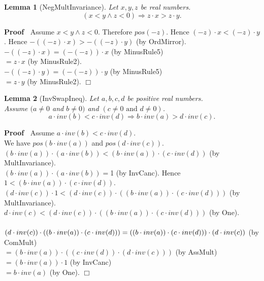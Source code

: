 \documentclass{article}
\newenvironment{forthel}{\begin{leftbar}}{\end{leftbar}}
\newenvironment{proof}{\noindent\textbf{Proof\ }}{\hspace*{\fill}$\Box$\medskip}
\newtheorem{lemma}{Lemma}
\newcommand{\dotequal}{=}
\begin{document}
\begin{forthel}
	
	\begin{lemma}[NegMultInvariance]
	Let $x, y, z$ be real numbers.
	$$(x < y \wedge z < 0) \Rightarrow z \cdot x > z \cdot y.$$
	\end{lemma}
	\begin{proof}
	Assume $x < y \wedge z < 0$.
	Therefore $pos(-z)$.    
	Hence $(-z) \cdot x < (-z) \cdot y$.
	Hence $-((-z) \cdot x) > -((-z) \cdot y)$ (by OrdMirror).
	\\$-((-z) \cdot x) \dotequal (-(-z)) \cdot x$ (by MinusRule5)
	\\$\dotequal z \cdot x$ (by MinusRule2).
	\\$-((-z) \cdot y) \dotequal (-(-z)) \cdot y$ (by MinusRule5)
	\\$\dotequal z \cdot y$ (by MinusRule2).
	\end{proof}
	
	
	\begin{lemma}[InvSwapIneq]
	Let $a, b, c, d$ be positive real numbers. \\Assume $(a \neq 0$ and $b \neq 0)$ and $(c \neq 0 \text{ and } d \neq 0)$. 
	$$a \cdot inv(b) < c \cdot inv(d) \Rightarrow b \cdot inv(a) > d \cdot inv(c).$$
	\end{lemma}
	\begin{proof}
	Assume $a \cdot inv(b) < c \cdot inv(d)$.
	\\We have $pos(b \cdot inv(a))$ and $pos(d \cdot inv(c))$.
	\\$(b \cdot inv(a)) \cdot (a \cdot inv(b)) < (b \cdot inv(a)) \cdot (c \cdot inv(d))$ (by MultInvariance).
	\\$(b \cdot inv(a)) \cdot (a \cdot inv(b)) = $1 (by InvCanc).
	Hence $1 < (b \cdot inv(a)) \cdot (c \cdot inv(d))$.
	$(d \cdot inv(c)) \cdot 1 < (d \cdot inv(c)) \cdot ((b \cdot inv(a)) \cdot (c \cdot inv(d)))$ (by MultInvariance).
	$d \cdot inv(c) < (d \cdot inv(c)) \cdot ((b \cdot inv(a)) \cdot (c \cdot inv(d)))$ (by One).
	\\\\$(d \cdot inv(c)) \cdot ((b \cdot inv(a)) \cdot (c \cdot inv(d))) \\\dotequal ((b \cdot inv(a)) \cdot (c \cdot inv(d))) \cdot (d \cdot inv(c))$ (by ComMult)
	\\$\dotequal (b \cdot inv(a)) \cdot ((c \cdot inv(d)) \cdot (d \cdot inv(c)))$ (by AssMult)
	\\$\dotequal (b \cdot inv(a)) \cdot 1$ (by InvCanc)
	\\$\dotequal b \cdot inv(a)$ (by One).   
	\end{proof}
	

\end{forthel}
\end{document}
